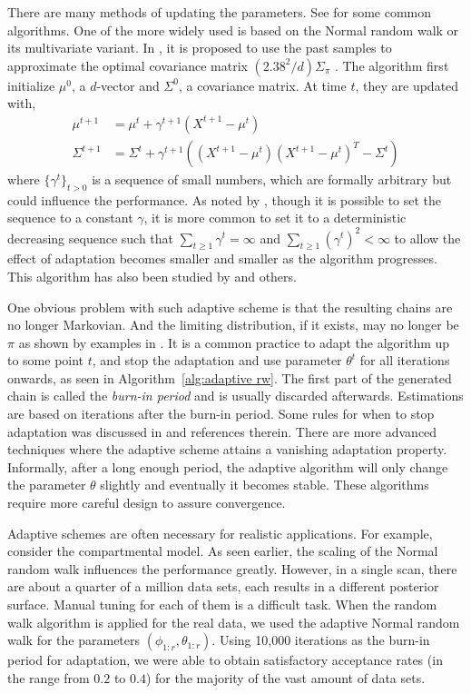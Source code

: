 There are many methods of updating the parameters. See \cite{Andrieu:2008kh}
for some common algorithms. One of the more widely used is based on the
Normal random walk or its multivariate variant. In
\cite{Haario:1999dh,Haario:2001gu}, it is proposed to use the past samples to
approximate the optimal covariance matrix $(2.38^2/d)\Sigma_{\pi}$
\cite{Gelman:1995vx}. The algorithm first initialize $\mu^0$, a $d$-vector
and $\Sigma^0$, a covariance matrix. At time $t$, they are updated with,
\begin{align}
  \mu^{t+1} &= \mu^t + \gamma^{t+1} (X^{t+1} - \mu^t) \\
  \Sigma^{t+1} &= \Sigma^t + \gamma^{t+1}((X^{t+1} - \mu^t)(X^{t+1} - \mu^t)^T
  - \Sigma^t)
\end{align}
where $\{\gamma^t\}_{t>0}$ is a sequence of small numbers, which are formally
arbitrary but could influence the performance. As noted by
\cite{Andrieu:2008kh}, though it is possible to set the sequence to a
constant $\gamma$, it is more common to set it to a deterministic decreasing
sequence such that $\sum_{t\ge1}\gamma^t = \infty$ and
$\sum_{t\ge1}(\gamma^t)^2<\infty$ to allow the effect of adaptation becomes
smaller and smaller as the algorithm progresses. This algorithm has also been
studied by \cite{Andrieu:2006tw} and others.

One obvious problem with such adaptive scheme is that the resulting chains
are no longer Markovian. And the limiting distribution, if it exists, may no
longer be $\pi$ as shown by examples in \cite{Andrieu:2008kh}. It is a common
practice to adapt the algorithm up to some point $t$, and stop the adaptation
and use parameter $\theta^t$ for all iterations onwards, as seen in
Algorithm~\ref{alg:adaptive rw}. The first part of the generated chain is
called the \emph{burn-in period} and is usually discarded afterwards.
Estimations are based on iterations after the burn-in period. Some rules for
when to stop adaptation was discussed in \cite{Andrieu:2008kh} and references
therein. There are more advanced techniques where the adaptive scheme attains
a vanishing adaptation property. Informally, after a long enough period, the
adaptive algorithm will only change the parameter $\theta$ slightly and
eventually it becomes stable. These algorithms require more careful design
to assure convergence.

Adaptive schemes are often necessary for realistic applications. For example,
consider the \pet compartmental model. As seen earlier, the scaling of the
Normal random walk influences the performance greatly. However, in a single
\pet scan, there are about a quarter of a million data sets, each results in
a different posterior surface. Manual tuning for each of them is a difficult
task. When the random walk algorithm is applied for the real data, we used
the adaptive Normal random walk for the parameters
$(\phi_{1:r},\theta_{1:r})$. Using 10,000 iterations as the burn-in period
for adaptation, we were able to obtain satisfactory acceptance rates (in the
range from $0.2$ to $0.4$) for the majority of the vast amount of data sets.

